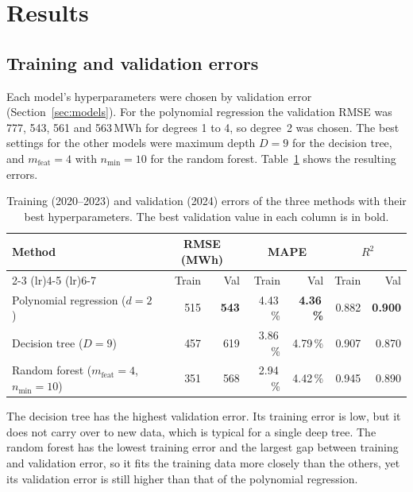 \documentclass[10pt,a4paper]{article}
\begin{document}
\section{Results}
\label{sec:results}

\subsection{Training and validation errors}
\label{sec:val-errors}

Each model's hyperparameters were chosen by validation error (Section~\ref{sec:models}). For
the polynomial regression the validation RMSE was 777, 543, 561 and 563\,MWh for degrees 1 to
4, so degree~2 was chosen. The best settings for the other models were maximum depth $D = 9$
for the decision tree, and $m_{\text{feat}} = 4$ with $n_{\min} = 10$ for the random forest.
Table~\ref{tab:results} shows the resulting errors.

\begin{table}[H]
  \centering
  \begin{tabular}{lrrrrrr}
    \toprule
    Method & \multicolumn{2}{c}{RMSE (MWh)} & \multicolumn{2}{c}{MAPE} & \multicolumn{2}{c}{$R^2$} \\
    \cmidrule(lr){2-3} \cmidrule(lr){4-5} \cmidrule(lr){6-7}
           & Train & Val & Train & Val & Train & Val \\
    \midrule
    Polynomial regression ($d = 2$) & 515 & \textbf{543} & 4.43\,\% & \textbf{4.36\,\%} & 0.882 & \textbf{0.900} \\
    Decision tree ($D = 9$)         & 457 & 619          & 3.86\,\% & 4.79\,\%          & 0.907 & 0.870 \\
    Random forest ($m_{\text{feat}} = 4$, $n_{\min} = 10$) & 351 & 568 & 2.94\,\% & 4.42\,\% & 0.945 & 0.890 \\
    \bottomrule
  \end{tabular}
  \caption{Training (2020--2023) and validation (2024) errors of the three methods with
  their best hyperparameters. The best validation value in each column is in bold.}
  \label{tab:results}
\end{table}

The decision tree has the highest validation error. Its training error is low, but it does
not carry over to new data, which is typical for a single deep tree. The random forest has
the lowest training error and the largest gap between training and validation error, so it
fits the training data more closely than the others, yet its validation error is still
higher than that of the polynomial regression.
\end{document}
